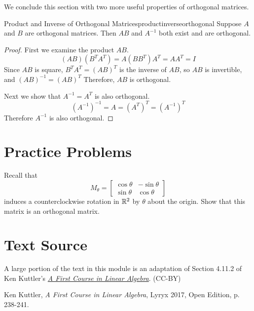 \documentclass{ximera}
\begin{document}
We conclude this section with two more useful properties of orthogonal matrices.

\begin{theorem}{Product and Inverse of Orthogonal Matrices}{productinverseorthogonal}
Suppose $A$ and $B$ are orthogonal matrices. Then $AB$ and $A^{-1}$ both exist and are orthogonal.
\end{theorem}

\begin{proof}
First we examine the product $AB$.
\[ (AB)(B^TA^T)=A(BB^T)A^T =AA^T=I \]
Since $AB$ is square, $B^TA^T=(AB)^T$ is the inverse of
$AB$, so $AB$ is invertible, and $(AB)^{-1}=(AB)^T$
Therefore, $AB$ is orthogonal.

Next we show that $A^{-1}=A^T$ is also orthogonal.
\[ (A^{-1})^{-1} = A = (A^T)^{T}
=(A^{-1})^{T} \]
Therefore $A^{-1}$ is also orthogonal.
\end{proof} 
\section*{Practice Problems}
\begin{problem}\label{prob:rotationsRorthogonal}
Recall that \begin{equation} 
M_{\theta}=\begin{bmatrix}
\cos\theta & -\sin\theta\\
\sin\theta & \cos\theta
\end{bmatrix}
\end{equation}
induces a counterclockwise rotation in $\mathbb{R}^2$ by $\theta$ about the origin.  Show that this matrix is an orthogonal matrix.
\end{problem}
  
\section*{Text Source}
A large portion of the text in this module is an adaptation of Section 4.11.2 of Ken Kuttler's \href{https://open.umn.edu/opentextbooks/textbooks/a-first-course-in-linear-algebra-2017}{\it A First Course in Linear Algebra}. (CC-BY)

Ken Kuttler, {\it  A First Course in Linear Algebra}, Lyryx 2017, Open Edition, p. 238-241.  
\end{document}
